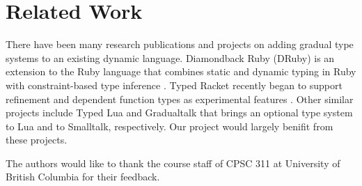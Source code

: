 \section{Related Work}
There have been many research publications and projects on adding gradual type
systems to an existing dynamic language. Diamondback Ruby (DRuby) is an
extension to the Ruby language that combines static and dynamic typing in Ruby
with constraint-based type inference \cite{furr2009combining}. Typed Racket
\cite{tobin2006interlanguage} recently began to support refinement and dependent
function types as experimental features \cite{racket2017refinement}. Other
similar projects include Typed Lua \cite{maidl2014typed} and Gradualtalk
\cite{allende2014gradual} that brings an optional type system to Lua and to
Smalltalk, respectively. Our project would largely benifit from these projects.

\appendix

\begin{acks}
    The authors would like to thank the course staff of CPSC 311 at University
    of British Columbia for their feedback.
\end{acks}
